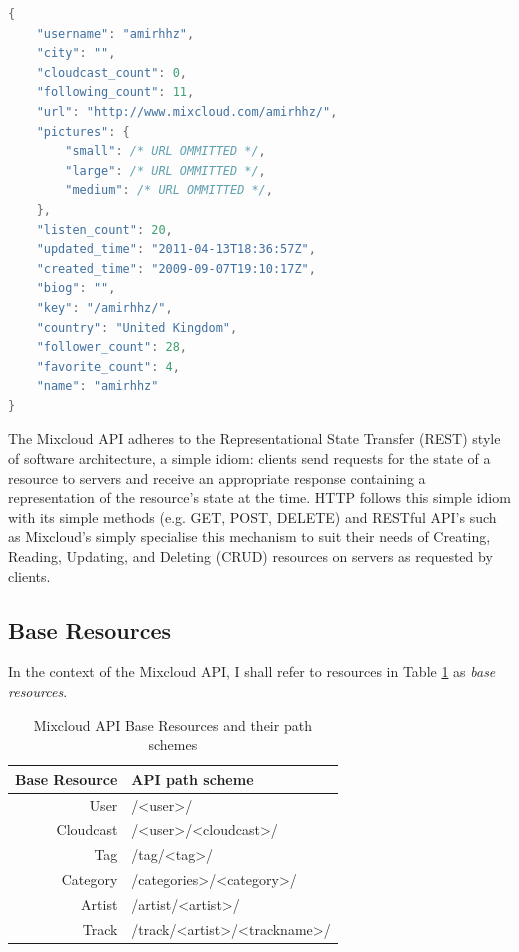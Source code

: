 \documentclass[a4paper,12pt,twoside,notitlepage]{report}
\begin{document}
\begin{lstlisting}[language=Java,caption=Sample output from api.mixcloud.com,
label=lst:api-sample]
{
    "username": "amirhhz", 
    "city": "", 
    "cloudcast_count": 0, 
    "following_count": 11, 
    "url": "http://www.mixcloud.com/amirhhz/", 
    "pictures": {
        "small": /* URL OMMITTED */, 
        "large": /* URL OMMITTED */, 
        "medium": /* URL OMMITTED */, 
    }, 
    "listen_count": 20, 
    "updated_time": "2011-04-13T18:36:57Z", 
    "created_time": "2009-09-07T19:10:17Z", 
    "biog": "", 
    "key": "/amirhhz/", 
    "country": "United Kingdom", 
    "follower_count": 28, 
    "favorite_count": 4, 
    "name": "amirhhz"
} 
\end{lstlisting}

The Mixcloud API adheres to the Representational State Transfer (REST)
style of software architecture, a simple idiom: clients send requests for the
state of a resource to servers and receive an appropriate response containing a
representation of the resource's state at the time. HTTP follows this simple
idiom with its simple methods (e.g. GET, POST, DELETE) and RESTful API's such as
Mixcloud's simply specialise this mechanism to suit their needs of Creating,
Reading, Updating, and Deleting (CRUD) resources on servers as requested by
clients.

\subsection{Base Resources}
In the context of the Mixcloud API, I shall refer to resources in Table 
\ref{tab:base-resources} as \emph{base
resources}.


\begin{table}[h]
  \begin{center}
  \begin{tabular}{r l}
Base Resource 	& API path scheme \\
\hline
User 		& /<user>/ \\
Cloudcast	& /<user>/<cloudcast>/ \\
Tag 		& /tag/<tag>/ \\
Category 	& /categories>/<category>/ \\
Artist 		& /artist/<artist>/ \\
Track		& /track/<artist>/<trackname>/ \\

  \end{tabular}
   
  \end{center}
\caption{Mixcloud API Base Resources and their path schemes}
\label{tab:base-resources}
\end{table}
\end{document}
